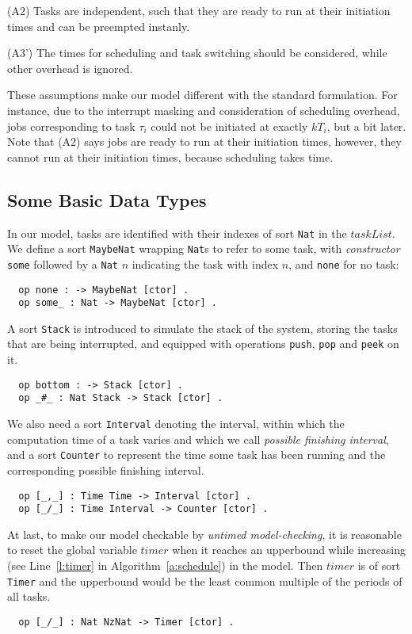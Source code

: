 \documentclass{llncs}
\begin{document}
(A2) Tasks are independent, such that they are ready to run at their
initiation times and can be preempted instanly.

(A3') The times for scheduling and task switching should be
considered, while other overhead is ignored.

These assumptions make our model different with the standard
formulation. For instance, due to the interrupt masking and
consideration of scheduling overhead, jobs corresponding to task
$\tau_i$ could not be initiated at exactly $kT_i$, but a bit later.
Note that (A2) says jobs are ready to run at their initiation times,
however, they cannot run at their initiation times, because scheduling
takes time.

\subsection{Some Basic Data Types}
In our model, tasks are identified with their indexes of sort
\verb|Nat| in the $taskList$. We define a sort \verb|MaybeNat|
wrapping \verb|Nat|s to refer to some task, with \emph{constructor}
\verb|some| followed by a \verb|Nat| $n$ indicating the task with
index $n$, and \verb|none| for no task:
\begin{verbatim}
  op none : -> MaybeNat [ctor] .
  op some_ : Nat -> MaybeNat [ctor] .
\end{verbatim}

A sort \verb|Stack| is introduced to simulate the stack of the system,
storing the tasks that are being interrupted, and equipped with
operations \verb|push|, \verb|pop| and \verb|peek| on it.
\begin{verbatim}
  op bottom : -> Stack [ctor] .
  op _#_ : Nat Stack -> Stack [ctor] .
\end{verbatim}

We also need a sort \verb|Interval| denoting the interval, within
which the computation time of a task varies and which we call
\emph{possible finishing interval}, and a sort \verb|Counter| to
represent the time some task has been running and the corresponding
possible finishing interval.
\begin{verbatim}
  op [_,_] : Time Time -> Interval [ctor] .
  op [_/_] : Time Interval -> Counter [ctor] .
\end{verbatim}

At last, to make our model checkable by \emph{untimed model-checking},
it is reasonable to reset the global variable $timer$ when it reaches
an upperbound while increasing (see Line~\ref{l:timer} in
Algorithm~\ref{a:schedule}) in the model. Then $timer$ is of sort
\verb|Timer| and the upperbound would be the least common multiple of
the periods of all tasks.
\begin{verbatim}
  op [_/_] : Nat NzNat -> Timer [ctor] .
\end{verbatim}
\end{document}
